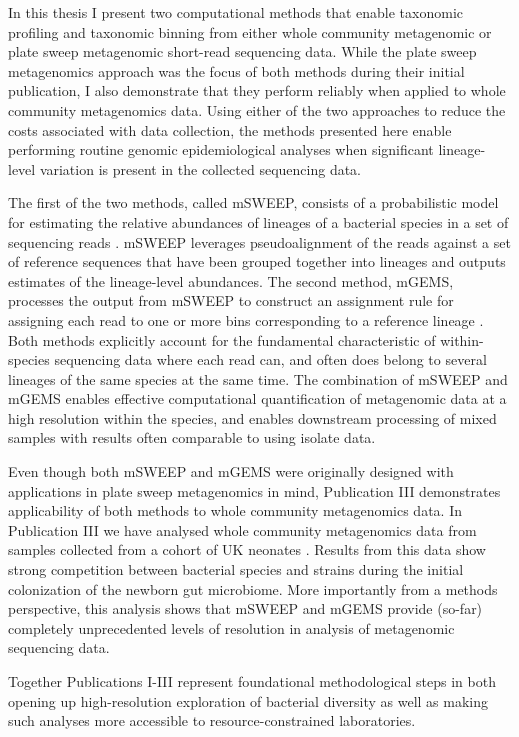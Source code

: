 \documentclass[officiallayout]{tktla}
\begin{document}
In this thesis I present two computational methods that enable
taxonomic profiling and taxonomic binning from either whole community metagenomic
or plate sweep metagenomic short-read sequencing data. While the plate
sweep metagenomics approach was the focus of both methods during their
initial publication, I also demonstrate that they perform reliably
when applied to whole community metagenomics data. Using either of the two
approaches to reduce the costs associated with data collection, the
methods presented here enable performing routine genomic
epidemiological analyses when significant lineage-level variation is
present in the collected sequencing data.

The first of the two methods, called mSWEEP, consists of a
probabilistic model for estimating the relative abundances of lineages
of a bacterial species in a set of sequencing reads
\citep{maklin_high-resolution_2021}. mSWEEP leverages pseudoalignment
\citep{bray2016near} of the reads against a set of reference sequences
that have been grouped together into lineages and outputs estimates of
the lineage-level abundances. The second method, mGEMS, processes the
output from mSWEEP to construct an assignment rule for assigning each
read to one or more bins corresponding to a reference lineage
\citep{maklin_bacterial_2021}. Both methods explicitly account for the
fundamental characteristic of within-species sequencing data where
each read can, and often does belong to several lineages of the same
species at the same time. The combination of mSWEEP and mGEMS enables
effective computational quantification of metagenomic data at a high
resolution within the species, and enables downstream processing of
mixed samples with results often comparable to using isolate data.

Even though both mSWEEP and mGEMS were originally designed with
applications in plate sweep metagenomics in mind, Publication III
\citep{maklin_strong_2022} demonstrates applicability of both methods
to whole community metagenomics data. In Publication III we have analysed whole community
metagenomics data from samples collected from a cohort of UK neonates
\citep{shao2019stunted}. Results from this data show strong
competition between bacterial species and strains during the initial
colonization of the newborn gut microbiome. More importantly from a
methods perspective, this analysis shows that mSWEEP and mGEMS provide
(so-far) completely unprecedented levels of resolution in analysis of
metagenomic sequencing data.

Together Publications I-III represent foundational
methodological steps in both opening up high-resolution exploration of
bacterial diversity as well as making such analyses more accessible to
resource-constrained laboratories.
\end{document}
